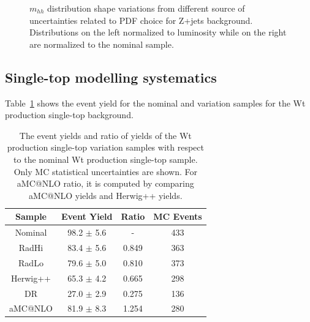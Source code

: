 \begin{figure}[!htbp]
\begin{center}
\caption{$m_{hh}$ distribution shape variations from different source of uncertainties related 
to PDF choice for Z+jets background. Distributions on the left normalized to luminosity while on 
the right are normalized to the nominal sample.}
\label{fig:boosted_systematics_zjets_sr_pdf}
\end{center}
\end{figure}

\FloatBarrier
%
%
\subsection{Single-top modelling systematics}
\label{app:boosted_syst_singletop}
Table~\ref{tab:boosted_systematics_singletopwt_yields} shows the event yield for 
the nominal and variation samples for the Wt production single-top background.

\begin{table}[htbp!]
\begin{center}
\begin{tabular}{c|c|c||c}
Sample     & Event Yield & Ratio     & MC Events\\ 
\hline
Nominal    & 98.2 $\pm$ 5.6 & -      & 433 \\
RadHi      & 83.4 $\pm$ 5.6 & 0.849  & 363 \\
RadLo      & 79.6 $\pm$ 5.0 & 0.810  & 373 \\
Herwig++   & 65.3 $\pm$ 4.2 & 0.665  & 298 \\
DR         & 27.0 $\pm$ 2.9 & 0.275  & 136 \\
aMC@NLO    & 81.9 $\pm$ 8.3 & 1.254  & 280 \\
\end{tabular}
\end{center}
\caption{The event yields and ratio of yields of the Wt production single-top variation samples
with respect to the nominal Wt production single-top sample. Only MC statistical uncertainties are shown.
For aMC@NLO ratio, it is computed by comparing aMC@NLO yields and Herwig++ yields.} 
\label{tab:boosted_systematics_singletopwt_yields}
\end{table}

